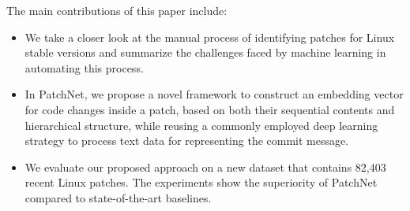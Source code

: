 The main contributions of this paper include:

\begin{itemize}[leftmargin=0.4cm]
\item We take a closer look at the manual process of identifying patches for Linux stable versions and summarize the challenges faced by machine learning in automating this process.
  
 \item In PatchNet, we propose a novel framework to construct an embedding vector for code changes inside a patch, based on both their sequential contents and hierarchical structure, while reusing a commonly employed deep learning strategy to
process text data for representing the commit message.
 
\item We evaluate our proposed approach on a new dataset that contains 82,403
  recent Linux
  patches. The experiments show the superiority of PatchNet compared to state-of-the-art baselines.  
\end{itemize}

